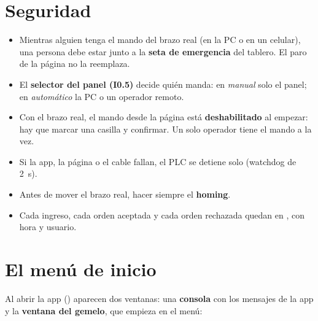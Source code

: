 
\section{Seguridad}
\begin{itemize}
\item Mientras alguien tenga el mando del brazo real (en la PC o en un celular), una persona debe estar junto a la \textbf{seta de emergencia} del tablero. El paro de la página no la reemplaza.
\item El \textbf{selector del panel (I0.5)} decide quién manda: en \emph{manual} solo el panel; en \emph{automático} la PC o un operador remoto.
\item Con el brazo real, el mando desde la página está \textbf{deshabilitado} al empezar: hay que marcar una casilla y confirmar. Un solo operador tiene el mando a la vez.
\item Si la app, la página o el cable fallan, el PLC se detiene solo (watchdog de 2~s).
\item Antes de mover el brazo real, hacer siempre el \textbf{homing}.
\item Cada ingreso, cada orden aceptada y cada orden rechazada quedan en , con hora y usuario.
\end{itemize}

\section{El menú de inicio}\label{sec:menu}

Al abrir la app (\abrirapp) aparecen dos ventanas: una \textbf{consola} con los mensajes de la app y la \textbf{ventana del gemelo}, que empieza en el menú:

